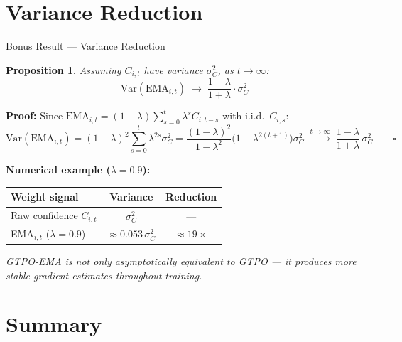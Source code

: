 \documentclass[aspectratio=169, 11pt]{beamer}
\newtheorem{proposition}{Proposition}
\newcommand{\EMA}{\mathrm{EMA}}
\begin{document}
\section{Variance Reduction}

\begin{frame}{Bonus Result — Variance Reduction}

\begin{proposition}
Assuming $C_{i,t}$ have variance $\sigma^2_C$, as $t \to \infty$:
\[
\mathrm{Var}(\EMA_{i,t}) \;\to\; \frac{1-\lambda}{1+\lambda} \cdot \sigma^2_C
\]
\end{proposition}

\textbf{Proof:} Since $\EMA_{i,t} = (1-\lambda)\sum_{s=0}^t \lambda^s C_{i,t-s}$
with i.i.d.\ $C_{i,s}$:
\[
\mathrm{Var}(\EMA_{i,t}) = (1-\lambda)^2 \sum_{s=0}^{t} \lambda^{2s}\sigma^2_C
= \frac{(1-\lambda)^2}{1-\lambda^{2}}\bigl(1-\lambda^{2(t+1)}\bigr)\sigma^2_C
\;\xrightarrow{t\to\infty}\; \frac{1-\lambda}{1+\lambda}\,\sigma^2_C \qquad\square
\]

\medskip
\textbf{Numerical example ($\lambda = 0.9$):}

\begin{center}
\begin{tabular}{lcc}
\toprule
Weight signal & Variance & Reduction \\
\midrule
Raw confidence $C_{i,t}$ & $\sigma^2_C$ & — \\
EMA$_{i,t}$ ($\lambda=0.9$) & $\approx 0.053\,\sigma^2_C$ & $\approx 19\times$ \\
\bottomrule
\end{tabular}
\end{center}

\medskip
\textit{GTPO-EMA is not only asymptotically equivalent to GTPO — it produces
more stable gradient estimates throughout training.}

\end{frame}

\section{Summary}
\end{document}

